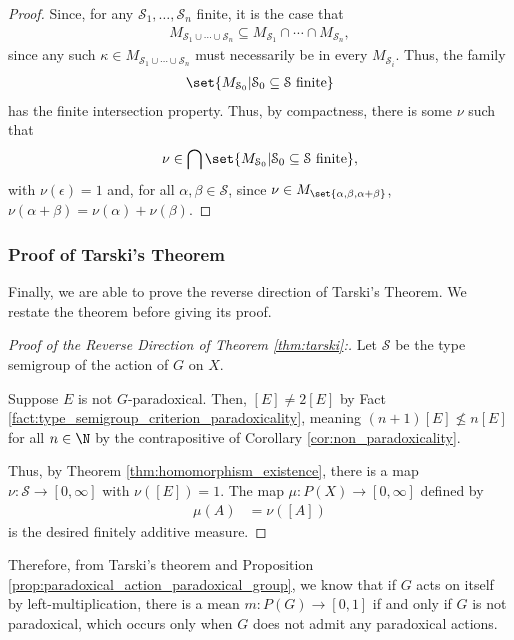 \documentclass[10pt]{mypackage2}
\begin{document}
\begin{proof}
  Since, for any $\mathcal{S}_1,\dots,\mathcal{S}_n$ finite, it is the case that
  \begin{align*}
    M_{\mathcal{S}_1\cup\cdots\cup \mathcal{S}_n} \subseteq M_{\mathcal{S}_1} \cap \cdots \cap M_{\mathcal{S}_n},
  \end{align*}
  since any such $\kappa\in M_{\mathcal{S}_1\cup\cdots\cup \mathcal{S}_n}$ must necessarily be in every $M_{\mathcal{S}_i}$. Thus, the family
  \begin{align*}
    \set{M_{\mathcal{S}_0}| \mathcal{S}_0\subseteq \mathcal{S}\text{ finite}}
  \end{align*}
  has the finite intersection property. Thus, by compactness, there is some $\nu$ such that
  \begin{align*}
    \nu\in \bigcap\set{M_{\mathcal{S}_0}| \mathcal{S}_0\subseteq \mathcal{S}\text{ finite}},
  \end{align*}
  with $\nu\left(\epsilon\right) = 1$ and, for all $\alpha,\beta\in \mathcal{S}$, since $\nu\in M_{\set{\alpha,\beta,\alpha + \beta}}$, $\nu\left(\alpha + \beta\right) = \nu\left(\alpha\right) + \nu\left(\beta\right)$.
\end{proof}
\subsubsection{Proof of Tarski's Theorem}%
Finally, we are able to prove the reverse direction of Tarski's Theorem. We restate the theorem before giving its proof.
\begin{tcolorbox}[blanker,breakable,left=3mm,before skip=10pt, after skip=10pt, borderline west={1pt}{0pt}{blue!50!white},sharp corners,]
\tarski*
\end{tcolorbox}
\begin{proof}[Proof of the Reverse Direction of Theorem \ref{thm:tarski}:]
  Let $\mathcal{S}$ be the type semigroup of the action of $G$ on $X$.\newline

  Suppose $E$ is not $G$-paradoxical. Then, $\left[E\right]\neq 2\left[E\right]$ by Fact \ref{fact:type_semigroup_criterion_paradoxicality}, meaning $\left(n+1\right)\left[E\right]\nleq n\left[E\right]$ for all $n\in \N$ by the contrapositive of Corollary \ref{cor:non_paradoxicality}.\newline

  Thus, by Theorem \ref{thm:homomorphism_existence}, there is a map $\nu\colon \mathcal{S}\rightarrow [0,\infty]$ with $\nu\left(\left[E\right]\right) = 1$. The map $\mu\colon P(X)\rightarrow [0,\infty]$ defined by
  \begin{align*}
    \mu\left(A\right) &= \nu\left(\left[A\right]\right)
  \end{align*}
  is the desired finitely additive measure.
\end{proof}
Therefore, from Tarski's theorem and Proposition \ref{prop:paradoxical_action_paradoxical_group}, we know that if $G$ acts on itself by left-multiplication, there is a mean $m\colon P(G)\rightarrow [0,1]$ if and only if $G$ is not paradoxical, which occurs only when $G$ does not admit any paradoxical actions.
\end{document}
